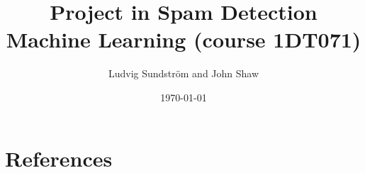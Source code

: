 \documentclass[a4paper,11pt]{article}
\title{\textbf{Project in Spam Detection} \\
    \textbf{Machine Learning (course 1DT071)} \\  
}
\author{Ludvig Sundstr\"{o}m and John Shaw}
\date{\today}
\begin{document}
\maketitle



\section{References}


\end{document}
